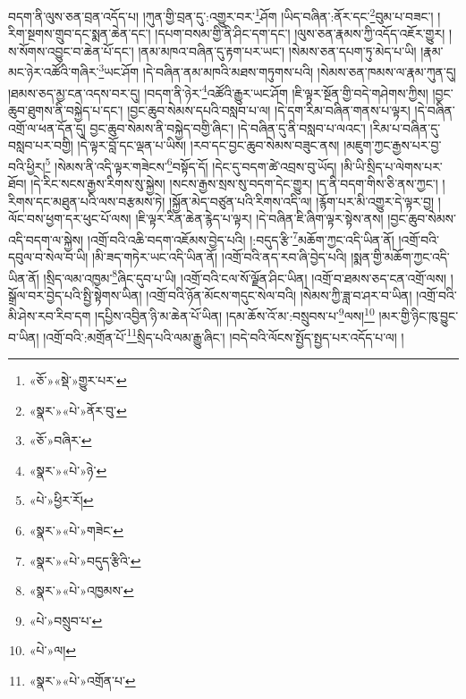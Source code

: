 བདག་ནི་ལུས་ཅན་བྲན་འདོད་པ། །ཀུན་གྱི་བྲན་དུ་:འགྱུར་བར་\footnote{«ཅོ་»«སྡེ་»གྱུར་པར་}ཤོག །ཡིད་བཞིན་:ནོར་དང་\footnote{«སྣར་»«པེ་»ནོར་བུ་}བུམ་པ་བཟང་། །རིག་སྔགས་གྲུབ་དང་སྨན་ཆེན་དང་། །དཔག་བསམ་གྱི་ནི་ཤིང་དག་དང་། །ལུས་ཅན་རྣམས་ཀྱི་འདོད་འཇོར་གྱུར། །ས་སོགས་འབྱུང་བ་ཆེན་པོ་དང་། །ནམ་མཁའ་བཞིན་དུ་རྟག་པར་ཡང་། །སེམས་ཅན་དཔག་ཏུ་མེད་པ་ཡི། །རྣམ་མང་ཉེར་འཚོའི་གཞིར་\footnote{«ཅོ་»བཞིར་}ཡང་ཤོག །དེ་བཞིན་ནམ་མཁའི་མཐས་གཏུགས་པའི། །སེམས་ཅན་ཁམས་ལ་རྣམ་ཀུན་དུ། །ཐམས་ཅད་མྱ་ངན་འདས་བར་དུ། །བདག་ནི་ཉེར་\footnote{«སྣར་»«པེ་»ཉེ་}འཚོའི་རྒྱུར་ཡང་ཤོག །ཇི་ལྟར་སྔོན་གྱི་བདེ་གཤེགས་ཀྱིས། །བྱང་ཆུབ་ཐུགས་ནི་བསྐྱེད་པ་དང་། །བྱང་ཆུབ་སེམས་དཔའི་བསླབ་པ་ལ། །དེ་དག་རིམ་བཞིན་གནས་པ་ལྟར། །དེ་བཞིན་འགྲོ་ལ་ཕན་དོན་དུ། བྱང་ཆུབ་སེམས་ནི་བསྐྱེད་བགྱི་ཞིང་། །དེ་བཞིན་དུ་ནི་བསླབ་པ་ལའང་། །རིམ་པ་བཞིན་དུ་བསླབ་པར་བགྱི། །དེ་ལྟར་བློ་དང་ལྡན་པ་ཡིས། །རབ་དང་བྱང་ཆུབ་སེམས་བཟུང་ནས། །མཇུག་ཀྱང་རྒྱས་པར་བྱ་བའི་ཕྱིར།\footnote{«པེ་»ཕྱིར་རོ།} །སེམས་ནི་འདི་ལྟར་གཟེངས་\footnote{«སྣར་»«པེ་»གཟེང་}བསྟོད་དོ། །དེང་དུ་བདག་ཚེ་འབྲས་བུ་ཡོད། །མི་ཡི་སྲིད་པ་ལེགས་པར་ཐོབ། །དེ་རིང་སངས་རྒྱས་རིགས་སུ་སྐྱེས། །སངས་རྒྱས་སྲས་སུ་བདག་དེང་གྱུར། །ད་ནི་བདག་གིས་ཅི་ནས་ཀྱང་། །རིགས་དང་མཐུན་པའི་ལས་བརྩམས་ཏེ། །སྐྱོན་མེད་བཙུན་པའི་རིགས་འདི་ལ། །རྙོག་པར་མི་འགྱུར་དེ་ལྟར་བྱ། །ལོང་བས་ཕྱག་དར་ཕུང་པོ་ལས། །ཇི་ལྟར་རིན་ཆེན་རྙེད་པ་ལྟར། །དེ་བཞིན་ཇི་ཞིག་ལྟར་སྟེས་ནས། །བྱང་ཆུབ་སེམས་འདི་བདག་ལ་སྐྱེས། །འགྲོ་བའི་འཆི་བདག་འཇོམས་བྱེད་པའི། །:བདུད་རྩི་\footnote{«སྣར་»«པེ་»བདུད་རྩིའི་}མཆོག་ཀྱང་འདི་ཡིན་ནོ། །འགྲོ་བའི་དབུལ་བ་སེལ་བ་ཡི། །མི་ཟད་གཏེར་ཡང་འདི་ཡིན་ནོ། །འགྲོ་བའི་ནད་རབ་ཞི་བྱེད་པའི། །སྨན་གྱི་མཆོག་ཀྱང་འདི་ཡིན་ནོ། །སྲིད་ལམ་འཁྱམ་\footnote{«སྣར་»«པེ་»འཁྱམས་}ཞིང་དུབ་པ་ཡི། །འགྲོ་བའི་ངལ་སོ་ལྗོན་ཤིང་ཡིན། །འགྲོ་བ་ཐམས་ཅད་ངན་འགྲོ་ལས། །སྒྲོལ་བར་བྱེད་པའི་སྤྱི་སྟེགས་ཡིན། །འགྲོ་བའི་ཉོན་མོངས་གདུང་སེལ་བའི། །སེམས་ཀྱི་ཟླ་བ་ཤར་བ་ཡིན། །འགྲོ་བའི་མི་ཤེས་རབ་རིབ་དག །དཔྱིས་འབྱིན་ཉི་མ་ཆེན་པོ་ཡིན། །དམ་ཆོས་འོ་མ་:བསྲུབས་པ་\footnote{«པེ་»བསྲུབ་པ་}ལས།\footnote{«པེ་»ལ།} །མར་གྱི་ཉིང་ཁུ་བྱུང་བ་ཡིན། །འགྲོ་བའི་:མགྲོན་པོ་\footnote{«སྣར་»«པེ་»འགྲོན་པ་}སྲིད་པའི་ལམ་རྒྱུ་ཞིང་། །བདེ་བའི་ལོངས་སྤྱོད་སྤྱད་པར་འདོད་པ་ལ། །
